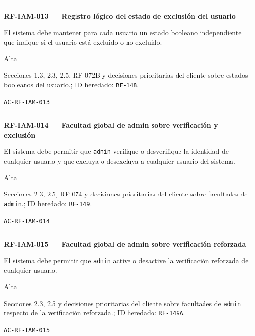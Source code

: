\documentclass[10pt,letterpaper]{article}
\begin{document}
\vspace{0.25em}\hrule\vspace{0.65em}
\noindent\textbf{RF-IAM-013 --- Registro lógico del estado de exclusión del usuario}\par
\begin{description}[style=nextline,leftmargin=3.15cm,labelwidth=2.8cm,font=\normalfont\bfseries]
\item[Obligación] El sistema debe mantener para cada usuario un estado booleano independiente que indique si el usuario está excluido o no excluido.
\item[Prioridad] Alta
\item[Procedencia] Secciones 1.3, 2.3, 2.5, RF-072B y decisiones prioritarias del cliente sobre estados booleanos del usuario.; ID heredado: \texttt{RF-148}.
\item[Verificación] \texttt{AC-RF-IAM-013}
\end{description}
\vspace{0.25em}\hrule\vspace{0.65em}
\noindent\textbf{RF-IAM-014 --- Facultad global de admin sobre verificación y exclusión}\par
\begin{description}[style=nextline,leftmargin=3.15cm,labelwidth=2.8cm,font=\normalfont\bfseries]
\item[Obligación] El sistema debe permitir que \texttt{admin} verifique o desverifique la identidad de cualquier usuario y que excluya o desexcluya a cualquier usuario del sistema.
\item[Prioridad] Alta
\item[Procedencia] Secciones 2.3, 2.5, RF-074 y decisiones prioritarias del cliente sobre facultades de \texttt{admin}.; ID heredado: \texttt{RF-149}.
\item[Verificación] \texttt{AC-RF-IAM-014}
\end{description}
\vspace{0.25em}\hrule\vspace{0.65em}
\noindent\textbf{RF-IAM-015 --- Facultad global de admin sobre verificación reforzada}\par
\begin{description}[style=nextline,leftmargin=3.15cm,labelwidth=2.8cm,font=\normalfont\bfseries]
\item[Obligación] El sistema debe permitir que \texttt{admin} active o desactive la verificación reforzada de cualquier usuario.
\item[Prioridad] Alta
\item[Procedencia] Secciones 2.3, 2.5 y decisiones prioritarias del cliente sobre facultades de \texttt{admin} respecto de la verificación reforzada.; ID heredado: \texttt{RF-149A}.
\item[Verificación] \texttt{AC-RF-IAM-015}
\end{description}
\end{document}
